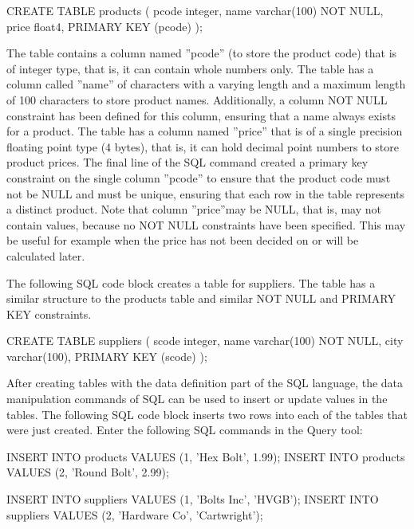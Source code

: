 \begin{samepage}
\begin{sqlcode}
CREATE TABLE products (
  pcode integer,
  name  varchar(100) NOT NULL,
  price float4,
  PRIMARY KEY (pcode) 
);
\end{sqlcode}
\end{samepage}

The table contains a column named ''pcode'' (to store the product code) that is of integer type, that is, it can contain whole numbers only. The table has a column called ''name'' of characters with a varying length and a maximum length of 100 characters to store product names. Additionally, a column NOT NULL constraint has been defined for this column, ensuring that a name always exists for a product. The table has a column named ''price'' that is of a single precision floating point type (4 bytes), that is, it can hold decimal point numbers to store product prices. The final line of the SQL command created a primary key constraint on the single column ''pcode'' to ensure that the product code must not be NULL and must be unique, ensuring that each row in the table represents a distinct product. Note that column ''price''may be NULL, that is, may not contain values, because no NOT NULL constraints have been specified. This may be useful for example when the price has not been decided on or will be calculated later.

The following SQL code block creates a table for suppliers. The table has a similar structure to the products table and similar NOT NULL and PRIMARY KEY constraints.

\begin{samepage}
\begin{sqlcode}
CREATE TABLE suppliers (
  scode integer,
  name  varchar(100) NOT NULL,
  city  varchar(100),
  PRIMARY KEY (scode) 
);
\end{sqlcode}
\end{samepage}

After creating tables with the data definition part of the SQL language, the data manipulation commands of SQL can be used to insert or update values in the tables. The following SQL code block inserts two rows into each of the tables that were just created. Enter the following SQL commands in the Query tool:

\begin{samepage}
\begin{sqlcode}
INSERT INTO products VALUES (1, 'Hex Bolt', 1.99);
INSERT INTO products VALUES (2, 'Round Bolt', 2.99);

INSERT INTO suppliers VALUES (1, 'Bolts Inc', 'HVGB');
INSERT INTO suppliers VALUES (2, 'Hardware Co', 'Cartwright');
\end{sqlcode}
\end{samepage}

